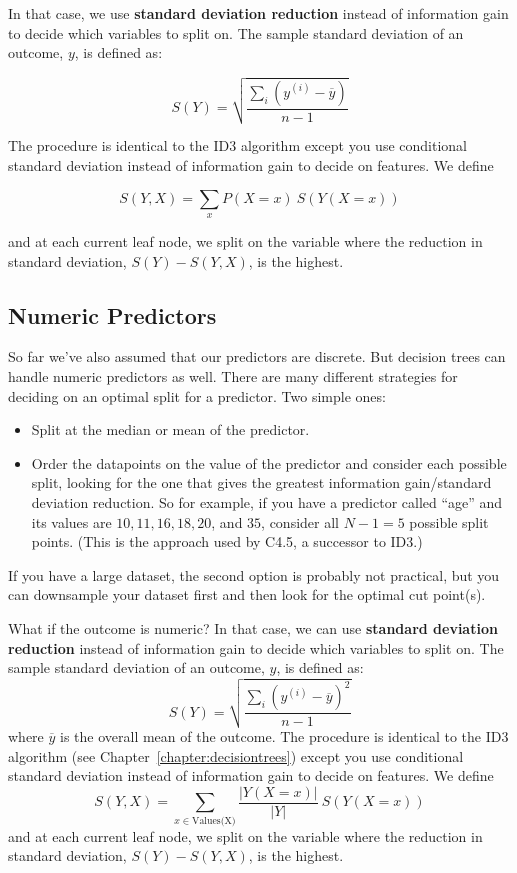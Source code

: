 In that case, we use \textbf{standard deviation reduction} instead of information gain to decide which variables to split on. The sample standard deviation of an outcome, $y$, is defined as:

$$ S(Y) = \sqrt{\frac{\sum_i(y^{(i)} - \overline{y})}{n-1}} $$

The procedure is identical to the ID3 algorithm except you use conditional standard deviation instead of information gain to decide on features. We define

$$ S(Y, X) = \sum_{x} P(X = x)~ S(Y(X=x)) $$

and at each current leaf node, we split on the variable where the reduction in standard deviation, $S(Y) - S(Y,X)$, is the highest. 

\subsection{Numeric Predictors}

So far we've also assumed that our predictors are discrete. But decision trees can handle numeric predictors as well. There are many different strategies for deciding on an optimal split for a predictor. Two simple ones:

\begin{itemize}
\item Split at the median or mean of the predictor.
\item Order the datapoints on the value of the predictor and consider each possible split, looking for the one that gives the greatest information gain/standard deviation reduction. So for example, if you have a predictor called ``age'' and its values are $10, 11, 16, 18, 20$, and $35$, consider all $N-1 = 5$ possible split points. (This is the approach used by C4.5, a successor to ID3.) 
\end{itemize}

If you have a large dataset, the second option is probably not practical, but you can downsample your dataset first and then look for the optimal cut point(s).

What if the outcome is numeric? In that case, we can use \textbf{standard deviation reduction} instead of information gain to decide which variables to split on. The sample standard deviation of an outcome, $y$, is defined as:
$$ S(Y) = \sqrt{\frac{\sum_i(y^{(i)} - \overline{y})^2}{n-1}} $$
where $\overline{y}$ is the overall mean of the outcome. The procedure is identical to the ID3 algorithm (see Chapter~\ref{chapter:decisiontrees}) except you use conditional standard deviation instead of information gain to decide on features. We define
$$ S(Y, X) = \sum_{x \in \text{Values(X)}} \frac{|Y(X=x)|}{|Y|}~ S(Y(X=x)) $$
and at each current leaf node, we split on the variable where the reduction in standard deviation, $S(Y) - S(Y,X)$, is the highest.

